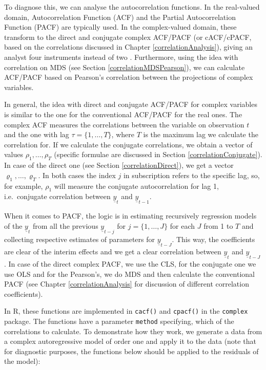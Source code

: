 \documentclass[
]{book}
\begin{document}
To diagnose this, we can analyse the autocorrelation functions. In the real-valued domain, Autocorrelation Function (ACF) and the Partial Autocorrelation Function (PACF) are typically used. In the complex-valued domain, these transform to the direct and conjugate complex ACF/PACF (or cACF/cPACF, based on the correlations discussed in Chapter \ref{correlationAnalysis}), giving an analyst four instruments instead of two \citep{Yao2010, Yao2011, Zhang2022}. Furthermore, using the idea with correlation on MDS (see Section \ref{correlationMDSPearson}), we can calculate ACF/PACF based on Pearson's correlation between the projections of complex variables.

In general, the idea with direct and conjugate ACF/PACF for complex variables is similar to the one for the conventional ACF/PACF for the real ones. The complex ACF measures the correlations between the variable on observation \(t\) and the one with lag \(\tau=\{1, \dots, T\}\), where \(T\) is the maximum lag we calculate the correlation for. If we calculate the conjugate correlations, we obtain a vector of values \(\rho_{1}, \dots, \rho_{T}\) (specific formulae are discussed in Section \ref{correlationConjugate}). In case of the direct one (see Section \ref{correlationDirect}), we get a vector \(\varrho_{1}, \dots, \varrho_{T}\). In both cases the index \(j\) in subscription refers to the specific lag, so, for example, \(\rho_{1}\) will measure the conjugate autocorrelation for lag 1, i.e.~conjugate correlation between \(\underline{y}_{t}\) and \(\underline{y}_{t-1}\).

When it comes to PACF, the logic is in estimating recursively regression models of the \(\underline{y}_{t}\) from all the previous \(\underline{y}_{t-j}\) for \(j=\{1, \dots, J\}\) for each \(J\) from 1 to \(T\) and collecting respective estimates of parameters for \(\underline{y}_{t-J}\). This way, the coefficients are clear of the interim effects and we get a clear correlation between \(\underline{y}_{t}\) and \(\underline{y}_{t-J}\). In case of the direct complex PACF, we use the CLS, for the conjugate one we use OLS and for the Pearson's, we do MDS and then calculate the conventional PACF (see Chapter \ref{correlationAnalysis} for discussion of different correlation coefficients).

In R, these functions are implemented in \texttt{cacf()} and \texttt{cpacf()} in the \texttt{complex} package. The functions have a parameter \texttt{method} specifying, which of the correlations to calculate. To demonstrate how they work, we generate a data from a complex autoregressive model of order one and apply it to the data (note that for diagnostic purposes, the functions below should be applied to the residuals of the model):
\end{document}
